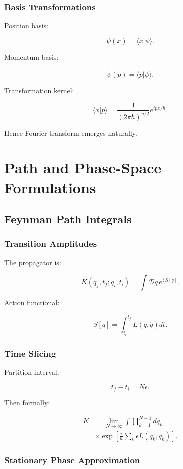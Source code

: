 \documentclass[11pt]{book}
\begin{document}
\section{Basis Transformations}

Position basis:

\[
\psi(x)=\langle x|\psi\rangle.
\]

Momentum basis:

\[
\tilde \psi(p)=\langle p|\psi\rangle.
\]

Transformation kernel:

\[
\langle x|p\rangle
=
\frac{1}{(2\pi\hbar)^{n/2}}
 e^{ipx/\hbar}.
\]

Hence Fourier transform emerges naturally.

\part{Path and Phase-Space Formulations}

\chapter{Feynman Path Integrals}

\section{Transition Amplitudes}

The propagator is:

\[
K(q_f,t_f;q_i,t_i)
=
\int \mathcal Dq \,
 e^{\frac{i}{\hbar}S[q]}.
\]

Action functional:

\[
S[q]
=
\int_{t_i}^{t_f}
L(q,\dot q)dt.
\]

\section{Time Slicing}

Partition interval:

\[
t_f-t_i=N\epsilon.
\]

Then formally:

\begin{align}
K &=
\lim_{N\to\infty}
\int
\prod_{k=1}^{N-1}dq_k \\
&\times
\exp
\left[
\frac{i}{\hbar}
\sum_k
\epsilon L(q_k,\dot q_k)
\right].
\end{align}

\section{Stationary Phase Approximation}
\end{document}
